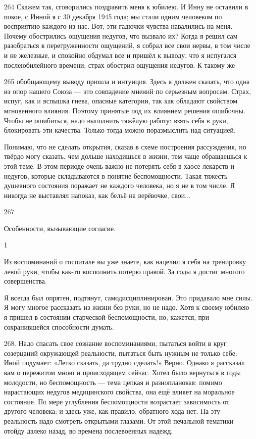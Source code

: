 264
Скажем так, сговорились поздравить меня к юбилею. И Инну не оставили в покое, с Инной я с 30 декабря 1945 года; мы стали одним человеком по восприятию каждого из нас. Вот, эти гадючки чувства навалились на меня. Почему обострились ощущения недугов, что вызвало их? Когда я решил сам разобраться в перегруженности ощущений, я собрал все свои нервы, в том числе и не железные, и спокойно обдумал все и пришёл к выводу, что я испугался послеюбилейного времени; страх обострил ощущения недугов. К такому же

265 обобщающему выводу пришла и интуиция. Здесь я должен сказать, что одна из опор нашего Союза — это совпадение мнений по серьезным вопросам. Страх, испуг, как и вспышка гнева, опасные категории, так как обладают свойством мгновенного влияния. Поэтому принятые под их влиянием решения ошибочны. Чтобы не ошибиться, надо выполнить тяжёлую работу: взять себя в руки, блокировать эти качества. Только тогда можно поразмыслить над ситуацией.

Понимаю, что не сделать открытия, сказав в схеме построения рассуждения, но твёрдо могу сказать, чем дольше находишься в жизни, тем чаще обращаешься к этой теме. В этом периоде очень важно не потерять себя в хаосе лекарств и недугов, которые складываются в понятие беспомощности. Такая тяжесть душевного состояния поражает не каждого человека, но я не в том числе. Я никогда не выставлял напоказ, как бельё на верёвочке, свои...

267

Особенности, вызывающие согласие.

1

Из воспоминаний о госпитале вы уже знаете, как нацелил я себя на тренировку левой руки, чтобы как-то восполнить потерю правой. За годы я достиг многого совершенства.

Я всегда был опрятен, подтянут, самодисциплинирован. Это придавало мне силы. Я могу многое рассказать из жизни без руки, но не надо. Хотя к своему юбилею я пришел в состоянии старческой беспомощности, но, кажется, при сохранившейся способности думать.

268. Надо спасать свое сознание воспоминаниями, пытаться войти в круг созерцаний окружающей реальности, пытаться быть нужным не только себе. Иной подумает: «Легко сказать, да трудно сделать!» Верно. Однако я рассказал вам о пережитом мною и происходящем сейчас. Хотел было вернуться в годы молодости, но беспомощность — тема цепкая и разноплановая: помимо нарастающих недугов медицинского свойства, она ещё влияет на моральное состояние. По мере углубления беспомощности возрастает зависимость от другого человека; и здесь уже, как правило, обратного хода нет. На эту реальность надо смотреть открытыми глазами. От этой печальной тематики отойду далеко назад, во времена послевоенных надежд.

